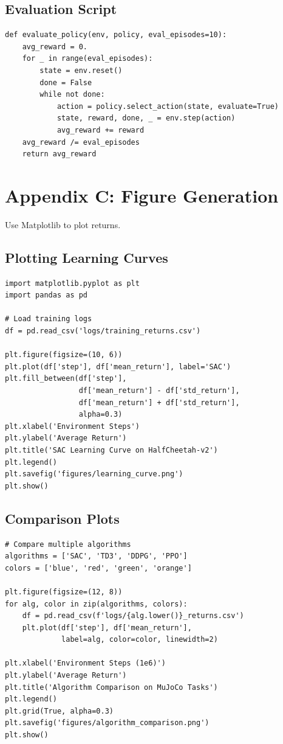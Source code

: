 \documentclass[11pt,a4paper]{article}
\begin{document}
\subsection{Evaluation Script}
\begin{lstlisting}
def evaluate_policy(env, policy, eval_episodes=10):
    avg_reward = 0.
    for _ in range(eval_episodes):
        state = env.reset()
        done = False
        while not done:
            action = policy.select_action(state, evaluate=True)
            state, reward, done, _ = env.step(action)
            avg_reward += reward
    avg_reward /= eval_episodes
    return avg_reward
\end{lstlisting}

\section{Appendix C: Figure Generation}
Use Matplotlib to plot returns.

\subsection{Plotting Learning Curves}
\begin{lstlisting}
import matplotlib.pyplot as plt
import pandas as pd

# Load training logs
df = pd.read_csv('logs/training_returns.csv')

plt.figure(figsize=(10, 6))
plt.plot(df['step'], df['mean_return'], label='SAC')
plt.fill_between(df['step'], 
                 df['mean_return'] - df['std_return'],
                 df['mean_return'] + df['std_return'], 
                 alpha=0.3)
plt.xlabel('Environment Steps')
plt.ylabel('Average Return')
plt.title('SAC Learning Curve on HalfCheetah-v2')
plt.legend()
plt.savefig('figures/learning_curve.png')
plt.show()
\end{lstlisting}

\subsection{Comparison Plots}
\begin{lstlisting}
# Compare multiple algorithms
algorithms = ['SAC', 'TD3', 'DDPG', 'PPO']
colors = ['blue', 'red', 'green', 'orange']

plt.figure(figsize=(12, 8))
for alg, color in zip(algorithms, colors):
    df = pd.read_csv(f'logs/{alg.lower()}_returns.csv')
    plt.plot(df['step'], df['mean_return'], 
             label=alg, color=color, linewidth=2)

plt.xlabel('Environment Steps (1e6)')
plt.ylabel('Average Return')
plt.title('Algorithm Comparison on MuJoCo Tasks')
plt.legend()
plt.grid(True, alpha=0.3)
plt.savefig('figures/algorithm_comparison.png')
plt.show()
\end{lstlisting}
\end{document}
